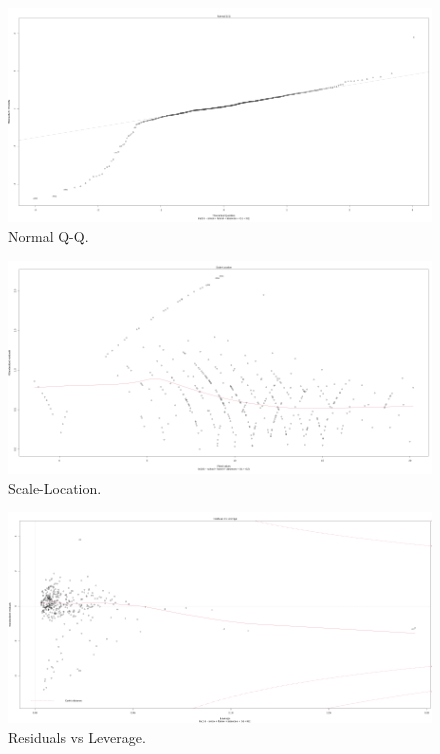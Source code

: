 \documentclass[a4paper]{article}
\begin{document}
\begin{figure}[H]
    \centering
    \includegraphics[width = 1.1\linewidth]{Images/51.PNG}
    \caption{Normal Q-Q.}
    \label{fig:linear9} 
\end{figure}
\begin{figure}[H]
    \centering
    \includegraphics[width = 1.1\linewidth]{Images/52.PNG}
    \caption{Scale-Location.}
    \label{fig:linear10}
\end{figure}
\begin{figure}[H]
    \centering
    \includegraphics[width = 1.1\linewidth]{Images/54.PNG}
    \caption{Residuals vs Leverage.}
    \label{fig:linear11}
\end{figure}
\end{document}
